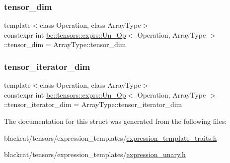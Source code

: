 \subsubsection{\texorpdfstring{tensor\+\_\+dim}{tensor\_dim}}
{\footnotesize\ttfamily template$<$class Operation, class Array\+Type$>$ \\
constexpr int \hyperlink{structbc_1_1tensors_1_1exprs_1_1Un__Op}{bc\+::tensors\+::exprs\+::\+Un\+\_\+\+Op}$<$ Operation, Array\+Type $>$\+::tensor\+\_\+dim = Array\+Type\+::tensor\+\_\+dim\hspace{0.3cm}{\ttfamily [static]}}

\mbox{\label{structbc_1_1tensors_1_1exprs_1_1Un__Op_a28c313438989aff30cd851a2edd39f37}} 
\subsubsection{\texorpdfstring{tensor\+\_\+iterator\+\_\+dim}{tensor\_iterator\_dim}}
{\footnotesize\ttfamily template$<$class Operation, class Array\+Type$>$ \\
constexpr int \hyperlink{structbc_1_1tensors_1_1exprs_1_1Un__Op}{bc\+::tensors\+::exprs\+::\+Un\+\_\+\+Op}$<$ Operation, Array\+Type $>$\+::tensor\+\_\+iterator\+\_\+dim = Array\+Type\+::tensor\+\_\+iterator\+\_\+dim\hspace{0.3cm}{\ttfamily [static]}}



The documentation for this struct was generated from the following files\+:\begin{DoxyCompactItemize}
\item 
blackcat/tensors/expression\+\_\+templates/\hyperlink{expression__template__traits_8h}{expression\+\_\+template\+\_\+traits.\+h}\item 
blackcat/tensors/expression\+\_\+templates/\hyperlink{expression__unary_8h}{expression\+\_\+unary.\+h}\end{DoxyCompactItemize}
